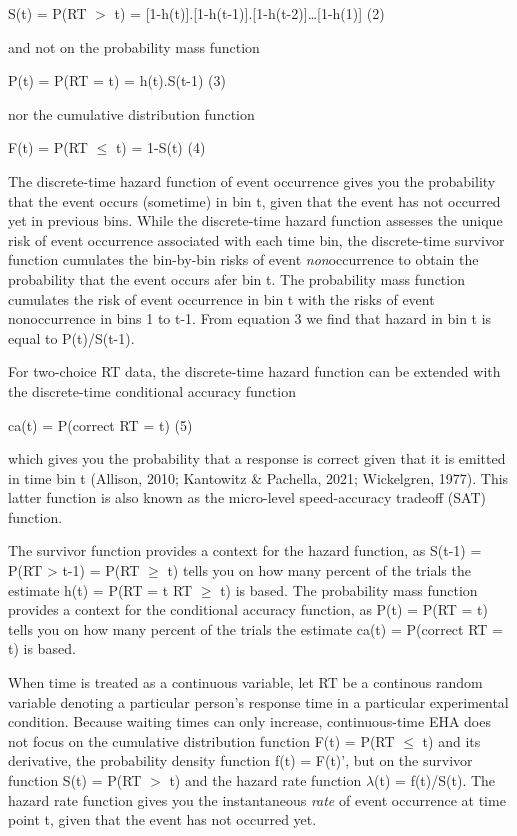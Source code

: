 \documentclass[
  man,floatsintext]{apa6}
\begin{document}
\noindent S(t) = P(RT \(>\) t) = {[}1-h(t){]}.{[}1-h(t-1){]}.{[}1-h(t-2){]}\ldots{[}1-h(1){]} \hfill  (2)

\noindent and not on the probability mass function

\noindent P(t) = P(RT = t) = h(t).S(t-1) \hfill  (3)

\noindent nor the cumulative distribution function

\noindent F(t) = P(RT \(\leq\) t) = 1-S(t) \hfill  (4)

The discrete-time hazard function of event occurrence gives you the probability that the event occurs (sometime) in bin t, given that the event has not occurred yet in previous bins. While the discrete-time hazard function assesses the unique risk of event occurrence associated with each time bin, the discrete-time survivor function cumulates the bin-by-bin risks of event \emph{non}occurrence to obtain the probability that the event occurs afer bin t. The probability mass function cumulates the risk of event occurrence in bin t with the risks of event nonoccurrence in bins 1 to t-1. From equation 3 we find that hazard in bin t is equal to P(t)/S(t-1).

For two-choice RT data, the discrete-time hazard function can be extended with the discrete-time conditional accuracy function

\noindent ca(t) = P(correct \textbar{} RT = t) \hfill  (5)

\noindent which gives you the probability that a response is correct given that it is emitted in time bin t (Allison, 2010; Kantowitz \& Pachella, 2021; Wickelgren, 1977). This latter function is also known as the micro-level speed-accuracy tradeoff (SAT) function.

The survivor function provides a context for the hazard function, as S(t-1) = P(RT \textgreater{} t-1) = P(RT \(\geq\) t) tells you on how many percent of the trials the estimate h(t) = P(RT = t\textbar{} RT \(\geq\) t) is based. The probability mass function provides a context for the conditional accuracy function, as P(t) = P(RT = t) tells you on how many percent of the trials the estimate ca(t) = P(correct \textbar{} RT = t) is based.

When time is treated as a continuous variable, let RT be a continous random variable denoting a particular person's response time in a particular experimental condition. Because waiting times can only increase, continuous-time EHA does not focus on the cumulative distribution function F(t) = P(RT \(\leq\) t) and its derivative, the probability density function f(t) = F(t)', but on the survivor function S(t) = P(RT \(>\) t) and the hazard rate function \(\lambda\)(t) = f(t)/S(t). The hazard rate function gives you the instantaneous \emph{rate} of event occurrence at time point t, given that the event has not occurred yet.
\end{document}

